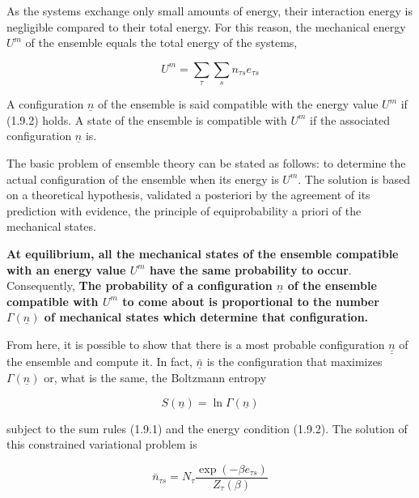 \documentclass{article}
\begin{document}
As the systems exchange only small amounts of energy, their interaction energy is negligible compared to their total energy. For this reason, the mechanical energy $U^{m}$ of the ensemble equals the total energy of the systems,

\begin{equation}
U^{m}=\sum_{\tau} \sum_{s} n_{\tau s} e_{\tau s} \tag{1.9.2}
\end{equation}

A configuration $\underline{n}$ of the ensemble is said compatible with the energy value $U^{m}$ if (1.9.2) holds. A state of the ensemble is compatible with $U^{m}$ if the associated configuration $\underline{n}$ is.

The basic problem of ensemble theory can be stated as follows: to determine the actual configuration of the ensemble when its energy is $U^{m}$. The solution is based on a theoretical hypothesis, validated a posteriori by the agreement of its prediction with evidence, the principle of equiprobability a priori of the mechanical states.



\textbf{At equilibrium, all the mechanical states of the ensemble compatible with an energy value $U^{m}$ have the same probability to occur}. Consequently,
\textbf{The probability of a configuration $\underline{n}$ of the ensemble compatible with $U^{m}$ to come about is proportional to the number $\Gamma(\underline{n})$ of mechanical states which determine that configuration.}

From here, it is possible to show that there is a most probable configuration $\underline{\underline{n}}$ of the ensemble and compute it. In fact, $\underline{\bar{n}}$ is the configuration that maximizes $\Gamma(\underline{n})$ or, what is the same, the Boltzmann entropy

\begin{equation}
S(\underline{n})=\ln \Gamma(\underline{n}) \tag{1.9.3}
\end{equation}

subject to the sum rules (1.9.1) and the energy condition (1.9.2). The solution of this constrained variational problem is

\begin{equation}
\bar{n}_{\tau s}=N_{\tau} \frac{\exp \left(-\beta e_{\tau s}\right)}{Z_{\tau}(\beta)} \tag{1.9.4}
\end{equation}
\end{document}
